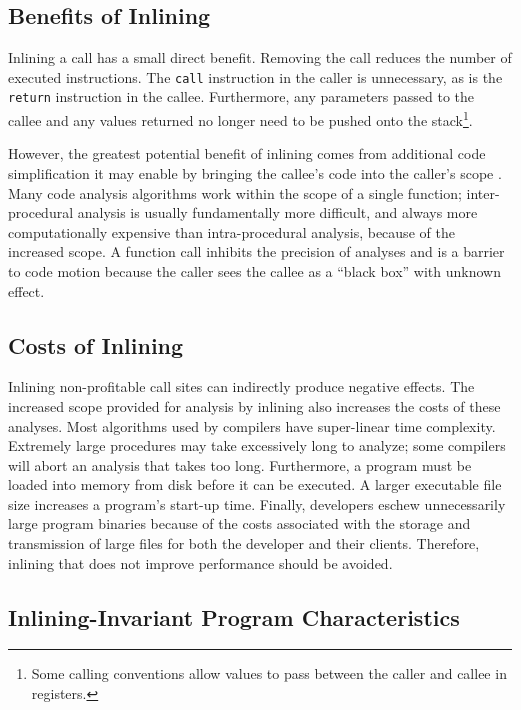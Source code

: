 \subsection{Benefits of Inlining}

Inlining a call has a small direct benefit.  Removing the call reduces the number of executed instructions.  The {\tt call} instruction in the caller is unnecessary, as is the {\tt return} instruction in the callee.  Furthermore, any parameters passed to the callee and any values returned no longer need to be pushed onto the stack\footnote{Some calling conventions allow values to pass between  the caller and callee in registers.}.

However, the greatest potential benefit of inlining comes from additional code simplification it may enable by bringing the callee's code into the caller's scope \cite{BerubePhD}. Many code analysis algorithms work within the scope of a single function; inter-procedural analysis is usually fundamentally more difficult, and always more computationally expensive than intra-procedural analysis, because of the increased scope.  A function call inhibits the precision of analyses and is a barrier to code motion because the caller sees the callee as a ``black box'' with unknown effect.

\subsection{Costs of Inlining}

Inlining non-profitable call sites can indirectly produce negative effects.  The increased scope provided for analysis by inlining also increases the costs of these analyses.  Most algorithms used by compilers have super-linear time complexity.  Extremely large procedures may take excessively long to analyze; some compilers will abort an analysis that takes too long.  Furthermore, a program must be loaded into memory from disk before it can be executed.  A larger executable file size increases a program's start-up time.  Finally, developers eschew unnecessarily large program binaries because of the costs associated with the storage and transmission of large files for both the developer and their clients. Therefore, inlining that does not improve performance should be avoided.

\subsection{Inlining-Invariant Program Characteristics}

